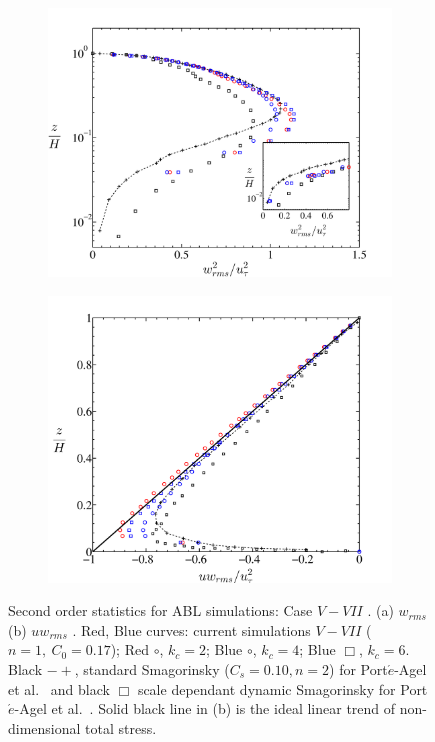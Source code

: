 \begin{figure}
        \centering
        \begin{subfigure}[t]{0.75\textwidth}
                \includegraphics[width=\linewidth]{Fig3/wrms_filter_n1.pdf}
                \caption{}
                \label{fig:wrms1a}
        \end{subfigure}
        \centering
        \begin{subfigure}[t]{0.75\textwidth}
                \includegraphics[width=\linewidth]{Fig3/uwrms_filter_n1.pdf}
                \caption{}
                \label{fig:uwrms1a}
        \end{subfigure}%
        \caption[Second order statistics $w_{rms}, \ uw_{rms}$, Case $V-VII$]{Second order statistics for ABL simulations: Case $V-VII$ . (a) $w_{rms}$ (b) $uw_{rms}$ . Red, Blue curves: current simulations $V-VII$ ($n = 1, \ C_0 = 0.17$);  Red $\circ$, $k_{c}=2$; Blue $\circ$, $k_{c} = 4$; Blue $\Box$, $k_{c} = 6$.  Black $-+$, standard Smagorinsky ($C_s = 0.10, n = 2$)  {for Port$\acute{e}$-Agel et al.~\cite{porte1fun}} and black $\Box$ scale dependant dynamic Smagorinsky for Port$\acute{e}$-Agel et al.~\cite{porte1fun}. Solid black line in (b) is the ideal linear trend of non-dimensional total stress. }\label{fig:stat022a}
\end{figure}

